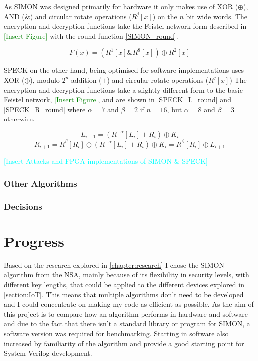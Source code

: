 \documentclass[12pt,twoside,a4paper]{report}
\begin{document}
    As SIMON was designed primarily for hardware it only makes use of XOR ($\oplus$), AND ($\&$) and circular rotate operations ($R^j[x]$) on the $n$ bit wide words.
    The encryption and decryption functions take the Feistel network form described in \textcolor{green}{[Insert Figure]} with the round function \autoref{SIMON_round}.
    
    \begin{equation}
    \label{SIMON_round}
    F(x) = (R^1[x]\&R^8[x]) \oplus R^2[x]
    \end{equation}
    
    SPECK on the other hand, being optimised for software implementations uses XOR ($\oplus$), modulo $2^n$ addition ($+$) and circular rotate operations ($R^j[x]$)
    The encryption and decryption functions take a slightly different form to the basic Feistel network, \textcolor{green}{[Insert Figure]}, and are shown in \autoref{SPECK_L_round} and \ref{SPECK_R_round} where $\alpha = 7$ and $\beta = 2$ if $n = 16$, but $\alpha = 8$ and $\beta = 3$ otherwise.
    
    \begin{equation}
    \label{SPECK_L_round}
    L_{i+1} = (R^{-\alpha}[L_i] + R_i) \oplus K_i
    \end{equation}
    \begin{equation}
    \label{SPECK_R_round}
    R_{i+1} = R^{\beta}[R_i] \oplus (R^{-\alpha}[L_i] + R_i) \oplus K_i = R^{\beta}[R_i] \oplus L_{i+1}
    \end{equation}
    
    \textcolor{cyan}{[Insert Attacks and FPGA implementations of SIMON \& SPECK]}
    
    \subsection{Other Algorithms}
    
    \subsection{Decisions}
    
    \chapter{Progress}
    Based on the research explored in \autoref{chapter:research} I chose the SIMON algorithm from the NSA, mainly because of its flexibility in security levels, with different key lengths, that could be applied to the different devices explored in \autoref{section:IoT}. This means that multiple algorithms don't need to be developed and I could concentrate on making my code as efficient as possible. As the aim of this project is to compare how an algorithm performs in hardware and software and due to the fact that there isn't a standard library or program for SIMON, a software version was required for benchmarking. Starting in software also increased by familiarity of the algorithm and provide a good starting point for System Verilog development.
    
\end{document}
